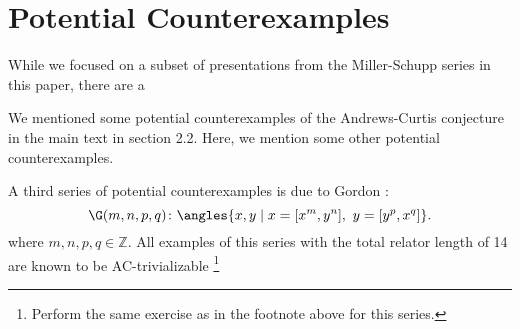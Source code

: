 
\section{Potential Counterexamples}

While we focused on a subset of presentations from the Miller-Schupp series in this paper, there are a 

We mentioned some potential counterexamples of the Andrews-Curtis conjecture in the main text in section 2.2. Here, we mention some other potential counterexamples. 

A third series of potential counterexamples is due to Gordon \cite{Brown}:
\[
\G(m, n, p, q) \colon \angles{x, y \mid x = [x^m, y^n],\ y = [y^p, x^q]}.
\]
where $m,n,p,q \in \mathbb{Z}$.
All examples of this series with the total relator length of 14 are known
to be AC-trivializable \cite{Bowman-McCaul}
\footnote{Perform the same exercise as in the footnote above for this series.}
\newline




